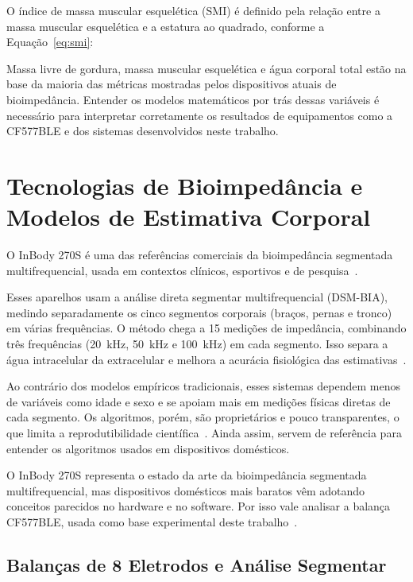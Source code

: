O índice de massa muscular esquelética (SMI) é definido pela relação entre a massa
muscular esquelética e a estatura ao quadrado, conforme a Equação~\ref{eq:smi}:


Massa livre de gordura, massa muscular esquelética e água corporal total estão na base
da maioria das métricas mostradas pelos dispositivos atuais de bioimpedância. Entender
os modelos matemáticos por trás dessas variáveis é necessário para interpretar
corretamente os resultados de equipamentos como a CF577BLE e dos sistemas
desenvolvidos neste trabalho.

\section{Tecnologias de Bioimpedância e Modelos de Estimativa Corporal}

O InBody 270S é uma das referências comerciais da bioimpedância segmentada
multifrequencial, usada em contextos clínicos, esportivos e de pesquisa~\cite{inbody2025}.

Esses aparelhos usam a análise direta segmentar multifrequencial (DSM-BIA), medindo
separadamente os cinco segmentos corporais (braços, pernas e tronco) em várias
frequências. O método chega a 15 medições de impedância, combinando três frequências
(20~kHz, 50~kHz e 100~kHz) em cada segmento. Isso separa a água intracelular da
extracelular e melhora a acurácia fisiológica das estimativas~\cite{besthealth2023,inbody2021}.

Ao contrário dos modelos empíricos tradicionais, esses sistemas dependem menos de
variáveis como idade e sexo e se apoiam mais em medições físicas diretas de cada
segmento. Os algoritmos, porém, são proprietários e pouco transparentes, o que limita
a reprodutibilidade científica~\cite{kyle2004}. Ainda assim, servem de referência para
entender os algoritmos usados em dispositivos domésticos.

O InBody 270S representa o estado da arte da bioimpedância segmentada multifrequencial,
mas dispositivos domésticos mais baratos vêm adotando conceitos parecidos no hardware e
no software. Por isso vale analisar a balança CF577BLE, usada como base experimental
deste trabalho~\cite{manualsplus2025}.

\subsection{Balanças de 8 Eletrodos e Análise Segmentar}

